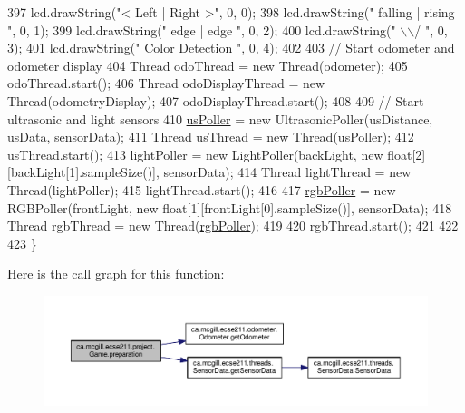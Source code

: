 \begin{DoxyCode}
397     lcd.drawString("<  Left  |  Right >", 0, 0);
398     lcd.drawString(" falling | rising  ", 0, 1);
399     lcd.drawString("  edge   |  edge   ", 0, 2);
400     lcd.drawString("        \(\backslash\)\(\backslash\)/        ", 0, 3);
401     lcd.drawString("  Color Detection  ", 0, 4);
402 
403     \textcolor{comment}{// Start odometer and odometer display}
404     Thread odoThread = new Thread(odometer);
405     odoThread.start();
406     Thread odoDisplayThread = new Thread(odometryDisplay);
407     odoDisplayThread.start();
408 
409     \textcolor{comment}{// Start ultrasonic and light sensors}
410     \hyperlink{enumca_1_1mcgill_1_1ecse211_1_1project_1_1_game_af6fee74efff891793b32352caa110465}{usPoller} = new UltrasonicPoller(usDistance, usData, sensorData);
411     Thread usThread = new Thread(\hyperlink{enumca_1_1mcgill_1_1ecse211_1_1project_1_1_game_af6fee74efff891793b32352caa110465}{usPoller});
412     usThread.start();
413     lightPoller = new LightPoller(backLight, new \textcolor{keywordtype}{float}[2][backLight[1].sampleSize()], sensorData);
414     Thread lightThread = new Thread(lightPoller);
415     lightThread.start();
416 
417     \hyperlink{enumca_1_1mcgill_1_1ecse211_1_1project_1_1_game_af24a953a0c3438670220dde36c532b5d}{rgbPoller} = new RGBPoller(frontLight, new \textcolor{keywordtype}{float}[1][frontLight[0].sampleSize()], sensorData);
418     Thread rgbThread = new Thread(\hyperlink{enumca_1_1mcgill_1_1ecse211_1_1project_1_1_game_af24a953a0c3438670220dde36c532b5d}{rgbPoller});
419     
420     rgbThread.start();
421     
422    
423   \}
\end{DoxyCode}
Here is the call graph for this function\+:\nopagebreak
\begin{figure}[H]
\begin{center}
\leavevmode
\includegraphics[width=350pt]{enumca_1_1mcgill_1_1ecse211_1_1project_1_1_game_a8f3c5b18f98ee56f5f03afd72fa40bcb_cgraph}
\end{center}
\end{figure}
\mbox{\label{enumca_1_1mcgill_1_1ecse211_1_1project_1_1_game_a032b53e9b16b9d470b461de4a311a698}} 
